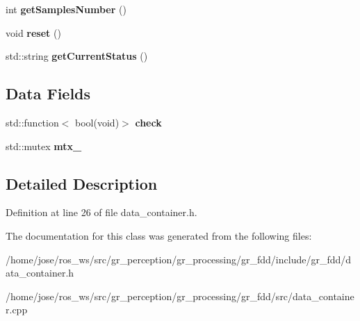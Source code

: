 \begin{DoxyCompactItemize}
\item 
\mbox{\label{classgr__fdd_1_1DataContainer_a24e54262b661120a615f63284d2d6ca1}} 
int {\bfseries get\+Samples\+Number} ()
\item 
\mbox{\label{classgr__fdd_1_1DataContainer_a23fed7dbe2fcd3e66ed4f71bdeda0087}} 
void {\bfseries reset} ()
\item 
\mbox{\label{classgr__fdd_1_1DataContainer_a9a4296634f2da8a0740b726e9b7d8077}} 
std\+::string {\bfseries get\+Current\+Status} ()
\end{DoxyCompactItemize}
\subsection*{Data Fields}
\begin{DoxyCompactItemize}
\item 
\mbox{\label{classgr__fdd_1_1DataContainer_ad2de665c232f396ba5269f3554bef3da}} 
std\+::function$<$ bool(void)$>$ {\bfseries check}
\item 
\mbox{\label{classgr__fdd_1_1DataContainer_ae439d1e6ea81cca49bb4d7c5ff197729}} 
std\+::mutex {\bfseries mtx\+\_\+}
\end{DoxyCompactItemize}


\subsection{Detailed Description}


Definition at line 26 of file data\+\_\+container.\+h.



The documentation for this class was generated from the following files\+:\begin{DoxyCompactItemize}
\item 
/home/jose/ros\+\_\+ws/src/gr\+\_\+perception/gr\+\_\+processing/gr\+\_\+fdd/include/gr\+\_\+fdd/data\+\_\+container.\+h\item 
/home/jose/ros\+\_\+ws/src/gr\+\_\+perception/gr\+\_\+processing/gr\+\_\+fdd/src/data\+\_\+container.\+cpp\end{DoxyCompactItemize}
